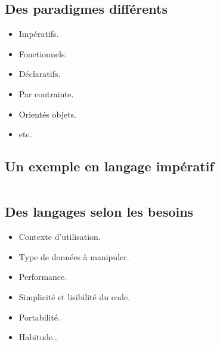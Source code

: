 \subsection{Des paradigmes différents}
\begin{frame}
	\begin{itemize}
		\item Impératifs.
		\item Fonctionnels.
		\item Déclaratifs.
		\item Par contrainte.
		\item Orientés objets.
		\item etc.
	\end{itemize}
\end{frame}

\subsection{Un exemple en langage impératif}
\begin{frame}
	\begin{example}{}
		\inputminted{python}{example-manipulation/python.py}
	\end{example}
\end{frame}

\subsection{Des langages selon les besoins}
\begin{frame}
	\begin{itemize}
		\item Contexte d'utilisation.
		\item Type de données à manipuler.
		\item Performance.
		\item Simplicité et lisibilité du code.
		\item Portabilité.
		\item Habitude… 
	\end{itemize}
\end{frame}

